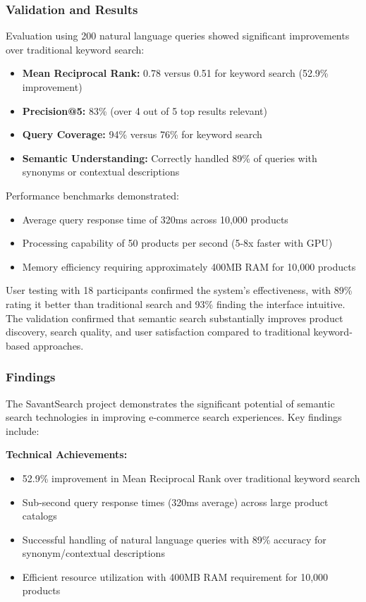 \documentclass[12pt,a4paper]{article}
\begin{document}
\subsubsection{Validation and Results}
Evaluation using 200 natural language queries showed significant improvements over traditional keyword search:
\begin{itemize}
    \item \textbf{Mean Reciprocal Rank:} 0.78 versus 0.51 for keyword search (52.9\% improvement)
    \item \textbf{Precision@5:} 83\% (over 4 out of 5 top results relevant)
    \item \textbf{Query Coverage:} 94\% versus 76\% for keyword search
    \item \textbf{Semantic Understanding:} Correctly handled 89\% of queries with synonyms or contextual descriptions
\end{itemize}

Performance benchmarks demonstrated:
\begin{itemize}
    \item Average query response time of 320ms across 10,000 products
    \item Processing capability of 50 products per second (5-8x faster with GPU)
    \item Memory efficiency requiring approximately 400MB RAM for 10,000 products
\end{itemize}

User testing with 18 participants confirmed the system's effectiveness, with 89\% rating it better than traditional search and 93\% finding the interface intuitive. The validation confirmed that semantic search substantially improves product discovery, search quality, and user satisfaction compared to traditional keyword-based approaches.

\subsubsection{Findings}
The SavantSearch project demonstrates the significant potential of semantic search technologies in improving e-commerce search experiences. Key findings include:

\textbf{Technical Achievements:}
\begin{itemize}
    \item 52.9\% improvement in Mean Reciprocal Rank over traditional keyword search
    \item Sub-second query response times (320ms average) across large product catalogs
    \item Successful handling of natural language queries with 89\% accuracy for synonym/contextual descriptions
    \item Efficient resource utilization with 400MB RAM requirement for 10,000 products
\end{itemize}
\end{document}
